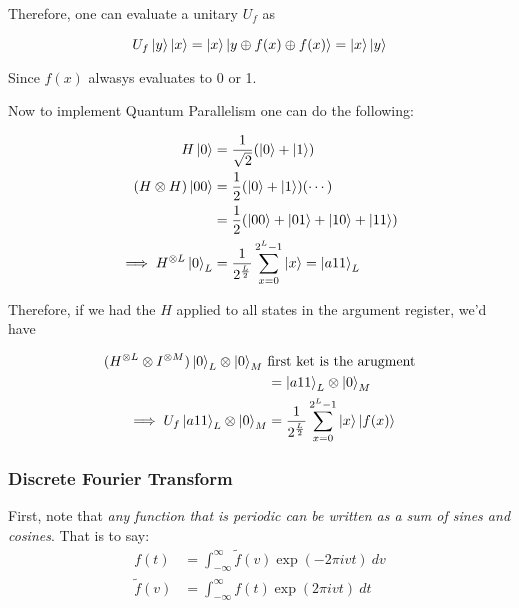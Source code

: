 \documentclass[reprint, amsmath,amssymb, aps]{revtex4-2}
\begin{document}
                Therefore, one can evaluate a unitary $U_f$ as

                \begin{equation*}
                U_{f}\ket{y}\ket{x} = \ket{x}\ket{y\oplus f(x)\oplus f(x)} = \ket{x}\ket{y}
                \end{equation*}

                Since $f(x)$ alwasys evaluates to 0 or 1.

                Now to implement Quantum Parallelism one can do the following:

                \begin{align*}
                    H\ket{0}&=\frac{1}{\sqrt{2}}(\ket{0}+\ket{1}) \\
                    (H\otimes H)\ket{00} &= \frac{1}{2}(\ket{0}+\ket{1})(\cdots) \\
                    &= \frac{1}{2}(\ket{00}+\ket{01}+\ket{10}+\ket{11}) \\
                    \implies H^{\otimes L}\ket{0}_L &= \frac{1}{2^{\frac{L}{2}}} \sum_{x=0}^{2^L - 1}\ket{x} = \ket{a 11}_L
                \end{align*}


                Therefore, if we had the $H$ applied to all states in the argument register, we'd have

                \begin{align*}
                    (H^{\otimes L}\otimes I^{\otimes M})\ket{0}_L \otimes \ket{0}_M \ &\text{first ket is the arugment}\\
                    &= \ket{a11}_L\otimes\ket{0}_M \\
                    \implies U_f \ket{a11}_L\otimes \ket{0}_M &= \frac{1}{2^{\frac{L}{2}}}\sum_{x=0}^{2^L -1}\ket{x}\ket{f(x)}                  
                \end{align*}

            \subsubsection{Discrete Fourier Transform}
                First, note that \textit{any function that is periodic can be written as a sum of sines and cosines}. That is to say:
                \begin{align*}
                    f(t) &= \int_{-\infty}^{\infty} \tilde{f}(v)\exp(-2\pi i v t) \ dv \\
                    \tilde{f}(v) &= \int_{-\infty}^{\infty} f(t)\exp(2\pi i v t) \ dt
                \end{align*}
\end{document}

